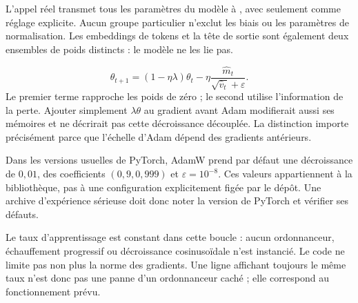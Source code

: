 L'appel réel transmet tous les paramètres du modèle à
, avec seulement 
comme réglage explicite. Aucun groupe particulier n'exclut les biais ou les
paramètres de normalisation. Les embeddings de tokens et la tête de sortie
sont également deux ensembles de poids distincts : le modèle ne les lie pas.

\[
 \theta_{t+1}=(1-\eta\lambda)\theta_t
       -\eta\frac{\widehat m_t}{\sqrt{\widehat v_t}+\varepsilon}.
\]
Le premier terme rapproche les poids de zéro ; le second utilise l'information
de la perte. Ajouter simplement $\lambda\theta$ au gradient avant Adam
modifierait aussi ses mémoires et ne décrirait pas cette décroissance découplée.
La distinction importe précisément parce que l'échelle d'Adam dépend des
gradients antérieurs.

Dans les versions usuelles de PyTorch, AdamW prend par défaut une décroissance
de $0{,}01$, des coefficients $(0{,}9,0{,}999)$ et
$\varepsilon=10^{-8}$. Ces valeurs appartiennent à la bibliothèque, pas à une
configuration explicitement figée par le dépôt. Une archive d'expérience
sérieuse doit donc noter la version de PyTorch et vérifier ses défauts.

Le taux d'apprentissage est constant dans cette boucle : aucun ordonnanceur,
échauffement progressif ou décroissance cosinusoïdale n'est instancié. Le code
ne limite pas non plus la norme des gradients. Une ligne affichant toujours
le même taux n'est donc pas une panne d'un ordonnanceur caché ; elle correspond
au fonctionnement prévu.



